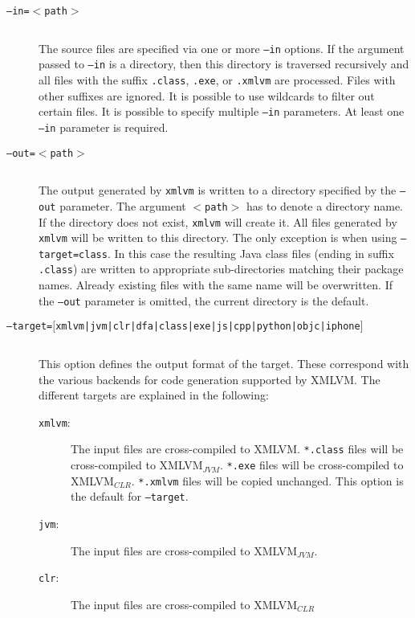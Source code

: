 \documentclass[12pt]{article}
\newcommand{\xmlvm}{\texttt{xmlvm} }
\begin{document}
\begin{description}

\item[\texttt{--in=$<$path$>$}] $ $

  The source files are specified via one or more \texttt{--in}
  options. If the argument passed to \texttt{--in} is a directory,
  then this directory is traversed recursively and all files with the
  suffix \texttt{.class}, \texttt{.exe}, or \texttt{.xmlvm} are
  processed. Files with other suffixes are ignored. It is possible to
  use wildcards to filter out certain files. It is possible to specify
  multiple \texttt{--in} parameters. At least one \texttt{--in}
  parameter is required.

\item[\texttt{--out=$<$path$>$}] $ $

  The output generated by \xmlvm is written to a directory specified
  by the \texttt{--out} parameter.  The argument \texttt{$<$path$>$}
  has to denote a directory name. If the directory does not exist,
  \xmlvm will create it. All files generated by \xmlvm will be written
  to this directory. The only exception is when using
  \texttt{--target=class}.  In this case the resulting Java class
  files (ending in suffix \texttt{.class}) are written to appropriate
  sub-directories matching their package names. Already existing files
  with the same name will be overwritten. If the \texttt{--out}
  parameter is omitted, the current directory is the default.

\item[\texttt{--target=$[$xmlvm|jvm|clr|dfa|class|exe|js|cpp|python|objc|iphone$]$}]
  $ $

  This option defines the output format of the target. These
  correspond with the various backends for code generation supported
  by XMLVM. The different targets are explained in the following:

\begin{description}
\item[\texttt{xmlvm}:] The input files are cross-compiled to XMLVM.
  \texttt{*.class} files will be cross-compiled to XMLVM$_{JVM}$.
  \texttt{*.exe} files will be cross-compiled to XMLVM$_{CLR}$.
  \texttt{*.xmlvm} files will be copied unchanged. This option is the
  default for \texttt{--target}.

\item[\texttt{jvm}:] The input files are cross-compiled to
  XMLVM$_{JVM}$.

\item[\texttt{clr}:] The input files are cross-compiled to
  XMLVM$_{CLR}$


\end{description}
\end{description}
\end{document}
